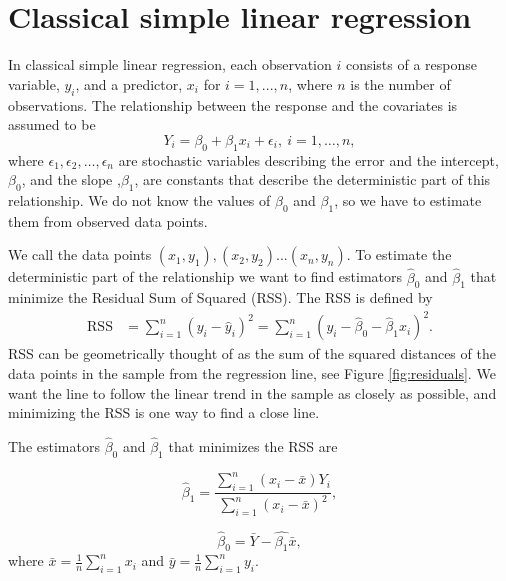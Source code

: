 \documentclass{article}
\begin{document}
\section{Classical simple linear regression} \label{sec:modLinReg}

In classical simple linear regression, each observation \(i\) consists of a
response variable, \(y_i\), and a predictor, \(x_i\) for \(i = 1, ..., n\), where \(n\) is the number of observations. The
relationship between the response and the covariates is assumed to be
\begin{equation*}
Y_i = \beta_0 + \beta_1 x_i + \epsilon_i,\ i = 1, \dots, n,
\end{equation*}
where \(\epsilon_1, \epsilon_2, \dots, \epsilon_n\) are stochastic variables
describing the error and the intercept, \(\beta_0\), and the slope ,\(\beta_1\),
are constants that describe the deterministic part of this relationship.
We do not know the values of \(\beta_0\) and \(\beta_1\), so we have to estimate
them from observed data points.

We call the data points \((x_1, y_1), (x_2, y_2)
... (x_n, y_n)\). To estimate the deterministic part of the relationship we want
to find estimators \(\hat{\beta}_0\) and \(\hat{\beta}_1\) that minimize the
Residual Sum of Squared (RSS). The RSS is defined by
\begin{align*}
  \mathrm{RSS} &= \sum_{i = 1}^n \left( y_i - \hat{y}_i \right)^2 
  = \sum_{i = 1}^n \left( y_i - \hat{\beta}_0 - \hat{\beta}_1 x_i \right)^2.
\end{align*}
RSS can be geometrically thought of as the sum of the squared distances of
the data points in the sample from the regression line, see Figure
\ref{fig:residuals}. We want the line to follow the linear trend in the sample
as closely as possible, and minimizing the RSS is one way to find a close line.

The estimators \(\hat{\beta}_0\) and \(\hat{\beta}_1\) that minimizes the RSS are

\begin{equation} \label{eq:beta1}
 \hat{\beta}_1 = \frac{\sum_{i = 1}^n\left( x_i - \bar{x} \right) Y_i}{\sum_{i = 1}^n\left( x_i - \bar{x} \right)^2} ,
\end{equation}

\begin{equation} \label{eq:beta0}
 \hat{\beta}_0 = \bar{Y} - \hat{\beta_1}\bar{x},
\end{equation}
where \(\bar{x} = \frac{1}{n} \sum_{i = 1}^n x_i\) and \(\bar{y} = \frac{1}{n}
\sum_{i = 1}^n y_i\). \cite[Chapter 11]{st1101}
\end{document}
